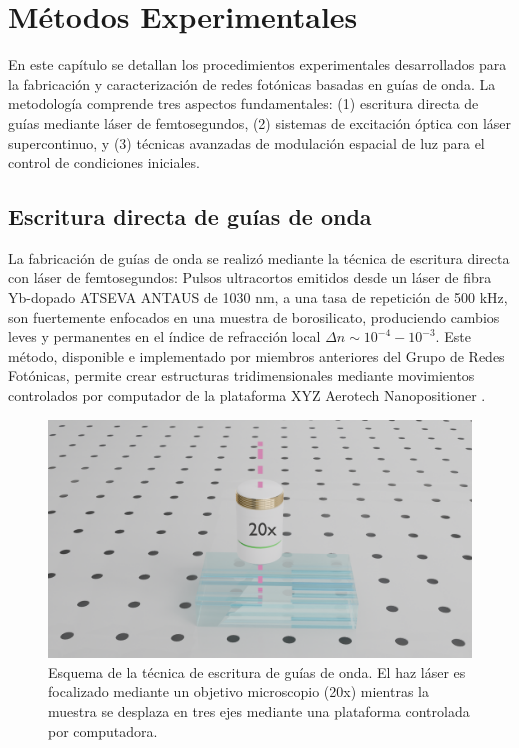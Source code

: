 \chapter{Métodos Experimentales \label{cap:exp}}

En este capítulo se detallan los procedimientos experimentales desarrollados para la fabricación y caracterización de redes fotónicas basadas en guías de onda. La metodología comprende tres aspectos fundamentales: (1) escritura directa de guías mediante láser de femtosegundos, (2) sistemas de excitación óptica con láser supercontinuo, y (3) técnicas avanzadas de modulación espacial de luz para el control de condiciones iniciales.


\section{Escritura directa de guías de onda \label{cap:fs}}

La fabricación de guías de onda se realizó mediante la técnica de escritura directa con láser de femtosegundos: Pulsos ultracortos emitidos desde un láser de fibra Yb-dopado ATSEVA ANTAUS de 1030 nm, a una tasa de repetición de 500 kHz, son fuertemente enfocados en una muestra de borosilicato, produciendo cambios leves y permanentes en el índice de refracción local $\Delta n \sim 10^{-4}-10^{-3}$. Este método, disponible e implementado por miembros anteriores del Grupo de Redes Fotónicas, permite crear estructuras tridimensionales mediante movimientos controlados por computador de la plataforma XYZ Aerotech Nanopositioner \citep{femto_writing}.

\begin{figure}[H]
    \centering
    \includegraphics[width=0.5\linewidth, trim={18cm 4cm 15cm 6cm},clip]{media/fabrication1}
    \caption[Esquema de la técnica de escritura de guías de onda.]{Esquema de la técnica de escritura de guías de onda. El haz láser es focalizado mediante un objetivo microscopio (20x) mientras la muestra se desplaza en tres ejes mediante una plataforma controlada por computadora.}
\end{figure}

